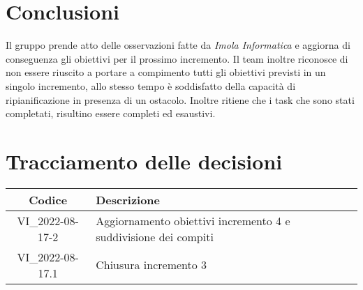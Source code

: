 \section{Conclusioni}
Il gruppo prende atto delle osservazioni fatte da \textit{Imola Informatica} e aggiorna di conseguenza gli obiettivi per il prossimo incremento. Il team inoltre riconosce di non essere riuscito a portare a compimento tutti gli obiettivi previsti in un singolo incremento, allo stesso tempo è soddisfatto della capacità di ripianificazione in presenza di un ostacolo. Inoltre ritiene che i task che sono stati completati, risultino essere completi ed esaustivi. 
\newpage

\section*{Tracciamento delle decisioni}
	\renewcommand{\arraystretch}{1.8} %
	\begin{tabular}{ |c|l| }
		\hline
		\textbf{Codice} & \textbf{Descrizione} \\
		\hline
		VI\_2022-08-17-2 & Aggiornamento obiettivi incremento 4 e suddivisione dei compiti  \\
		\hline
		VI\_2022-08-17.1 & Chiusura incremento 3 \\
		\hline
	\end{tabular}